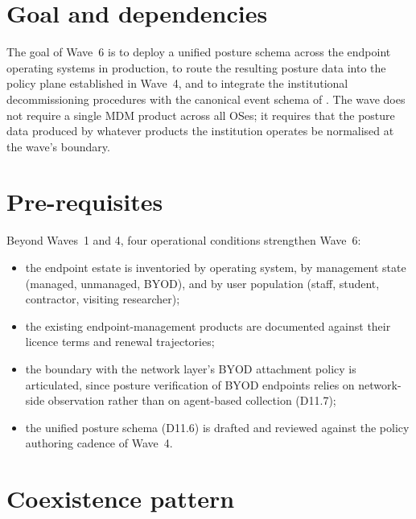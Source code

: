 \section{Goal and dependencies}
\label{sec:w6-goal}

The goal of Wave~6 is to deploy a unified posture schema across
the endpoint operating systems in production, to route the
resulting posture data into the policy plane established in Wave~4,
and to integrate the institutional decommissioning procedures with
the canonical event schema of . The wave
does not require a single MDM product across all OSes; it requires
that the posture data produced by whatever products the institution
operates be normalised at the wave's boundary.

\section{Pre-requisites}
\label{sec:w6-prereq}

Beyond Waves~1 and 4, four operational conditions strengthen
Wave~6:

\begin{itemize}[leftmargin=1.5em,nosep]
  \item the endpoint estate is inventoried by operating system,
    by management state (managed, unmanaged, BYOD), and by user
    population (staff, student, contractor, visiting researcher);
  \item the existing endpoint-management products are documented
    against their licence terms and renewal trajectories;
  \item the boundary with the network layer's BYOD attachment
    policy is articulated, since posture verification of BYOD
    endpoints relies on network-side observation rather than on
    agent-based collection (D11.7);
  \item the unified posture schema (D11.6) is drafted and reviewed
    against the policy authoring cadence of Wave~4.
\end{itemize}

\section{Coexistence pattern}
\label{sec:w6-coexistence}

